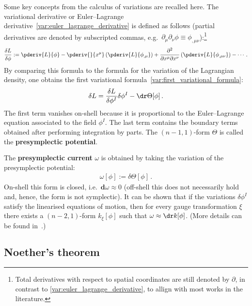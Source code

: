     Some key concepts from the calculus of variations are recalled here. The variational derivative or Euler--Lagrange derivative~\eqref{var:euler_lagrange_derivative} is defined as follows (partial derivatives are denoted by subscripted commas, e.g.~$\partial_\mu\partial_\nu\phi\equiv\phi_{,\mu\nu}$):\footnote{Total derivatives with respect to spatial coordinates are still denoted by $\partial$, in contrast to \cref{var:euler_lagrange_derivative}, to allign with most works in the literature.}
    \begin{gather}
        \frac{\delta L}{\delta \phi} := \pderiv{L}{\phi} - \pderiv{}{x^\mu}\left(\pderiv{L}{\phi_{,\mu}}\right) + \frac{\partial^2}{\partial x^\mu\partial x^\nu}\left(\pderiv{L}{\phi_{,\mu\nu}}\right) -\cdots\,.
    \end{gather}
    By comparing this formula to the formula for the variation of the Lagrangian density, one obtains the first variational formula~\eqref{var:first_variational_formula}:
    \begin{gather}
        \delta L = \frac{\delta L}{\delta\phi^I}\delta\phi^I - \dr\Theta[\phi]\,.
    \end{gather}
    The first term vanishes on-shell because it is proportional to the Euler--Lagrange equation associated to the field $\phi^I$. The last term contains the boundary terms obtained after performing integration by parts. The $(n-1,1)$-form $\Theta$ is called the \textbf{presymplectic potential}.

    The \textbf{presymplectic current} $\omega$ is obtained by taking the variation of the presymplectic potential:
    \begin{gather}
        \omega[\phi] := \delta\Theta[\phi]\,.
    \end{gather}
    On-shell this form is closed, i.e.~$\mathbf{d}\omega\approx0$ (off-shell this does not necessarily hold and, hence, the form is not symplectic). It can be shown that if the variations $\delta\phi^I$ satisfy the linearised equations of motion, then for every gauge transformation $\xi$ there exists a $(n-2,1)$-form $k_\xi[\phi]$ such that $\omega\approx\dr k[\phi]$. (More details can be found in~\citet{compere_advanced_2019}.)

\subsection{Noether's theorem}

